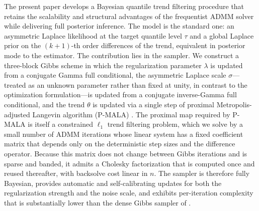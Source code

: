 The present paper develops a Bayesian quantile trend filtering procedure that retains the scalability and structural advantages of the frequentist ADMM solver while delivering full posterior inference. The model is the standard one: an asymmetric Laplace likelihood at the target quantile level $\tau$ and a global Laplace prior on the $(k+1)$-th order differences of the trend, equivalent in posterior mode to the \citet{brantley2020baseline} estimator. The contribution lies in the sampler. We construct a three-block Gibbs scheme in which the regularization parameter $\lambda$ is updated from a conjugate Gamma full conditional, the asymmetric Laplace scale $\sigma$---treated as an unknown parameter rather than fixed at unity, in contrast to the optimization formulation---is updated from a conjugate inverse-Gamma full conditional, and the trend $\theta$ is updated via a single step of proximal Metropolis-adjusted Langevin algorithm (P-MALA) \citep{pereyra2016proximal}. The proximal map required by P-MALA is itself a constrained $\ell_1$ trend filtering problem, which we solve by a small number of ADMM iterations whose linear system has a fixed coefficient matrix that depends only on the deterministic step sizes and the difference operator. Because this matrix does not change between Gibbs iterations and is sparse and banded, it admits a Cholesky factorization that is computed once and reused thereafter, with backsolve cost linear in $n$. The sampler is therefore fully Bayesian, provides automatic and self-calibrating updates for both the regularization strength and the noise scale, and exhibits per-iteration complexity that is substantially lower than the dense Gibbs sampler of \citet{onizuka2024fast}.

